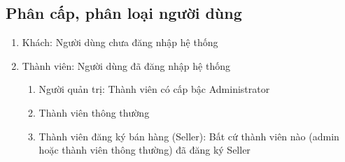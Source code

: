 \subsection{Phân cấp, phân loại người dùng}
\begin{enumerate}
	\item Khách: Người dùng chưa đăng nhập hệ thống
	\item Thành viên: Người dùng đã đăng nhập hệ thống
	\begin{enumerate}
		\item Người quản trị: Thành viên có cấp bậc Administrator
		\item Thành viên thông thường
		\item Thành viên đăng ký bán hàng (Seller): Bất cứ thành viên nào (admin hoặc thành viên thông thường) đã đăng ký Seller
	\end{enumerate}
\end{enumerate}

